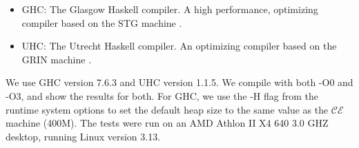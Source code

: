 \begin{itemize}
\item GHC: The Glasgow Haskell compiler. A high performance, optimizing compiler
based on the STG machine \cite{jonesstg}.
\item UHC: The Utrecht Haskell compiler. An optimizing compiler based on the
GRIN machine \cite{boquist1997grin, dijkstra2009architecture}.
\end{itemize}

We use GHC version 7.6.3 and UHC version 1.1.5. We compile with both -O0 and
-O3, and show the results for both. For GHC, we use the -H flag from the runtime
system options to set the default heap size to the same value as the
$\mathcal{CE}$ machine (400M). The tests were run on an AMD Athlon II X4 640 3.0
GHZ desktop, running Linux version 3.13. 
